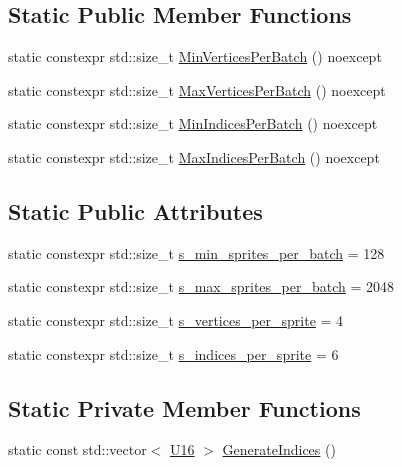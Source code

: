 \subsection*{Static Public Member Functions}
\begin{DoxyCompactItemize}
\item 
static constexpr std\+::size\+\_\+t \mbox{\hyperlink{classmage_1_1rendering_1_1_sprite_batch_mesh_a256f9f0dd41a71cbc2572cfc65d6f711}{Min\+Vertices\+Per\+Batch}} () noexcept
\item 
static constexpr std\+::size\+\_\+t \mbox{\hyperlink{classmage_1_1rendering_1_1_sprite_batch_mesh_ac568847d5fb99704ab6c494990df6d59}{Max\+Vertices\+Per\+Batch}} () noexcept
\item 
static constexpr std\+::size\+\_\+t \mbox{\hyperlink{classmage_1_1rendering_1_1_sprite_batch_mesh_a58511e130cddfc6e19d551a0416f3111}{Min\+Indices\+Per\+Batch}} () noexcept
\item 
static constexpr std\+::size\+\_\+t \mbox{\hyperlink{classmage_1_1rendering_1_1_sprite_batch_mesh_a6cbb734ebaa67a64b9cb0848c653c474}{Max\+Indices\+Per\+Batch}} () noexcept
\end{DoxyCompactItemize}
\subsection*{Static Public Attributes}
\begin{DoxyCompactItemize}
\item 
static constexpr std\+::size\+\_\+t \mbox{\hyperlink{classmage_1_1rendering_1_1_sprite_batch_mesh_a0ec9ce27bb7ea16d809bcfa450b94dfa}{s\+\_\+min\+\_\+sprites\+\_\+per\+\_\+batch}} = 128
\item 
static constexpr std\+::size\+\_\+t \mbox{\hyperlink{classmage_1_1rendering_1_1_sprite_batch_mesh_a972957a2aa6ef81efb44e22279cad612}{s\+\_\+max\+\_\+sprites\+\_\+per\+\_\+batch}} = 2048
\item 
static constexpr std\+::size\+\_\+t \mbox{\hyperlink{classmage_1_1rendering_1_1_sprite_batch_mesh_ac8c225873569c17628ce6a1a8df2d264}{s\+\_\+vertices\+\_\+per\+\_\+sprite}} = 4
\item 
static constexpr std\+::size\+\_\+t \mbox{\hyperlink{classmage_1_1rendering_1_1_sprite_batch_mesh_a36799a6fe0991b64413b14ae43c0ee7d}{s\+\_\+indices\+\_\+per\+\_\+sprite}} = 6
\end{DoxyCompactItemize}
\subsection*{Static Private Member Functions}
\begin{DoxyCompactItemize}
\item 
static const std\+::vector$<$ \mbox{\hyperlink{namespacemage_a1701f09b2c3ed62768e1b7d00bf30d0b}{U16}} $>$ \mbox{\hyperlink{classmage_1_1rendering_1_1_sprite_batch_mesh_aa6eba899261d3cd5b22b53a7352be0a1}{Generate\+Indices}} ()
\end{DoxyCompactItemize}
